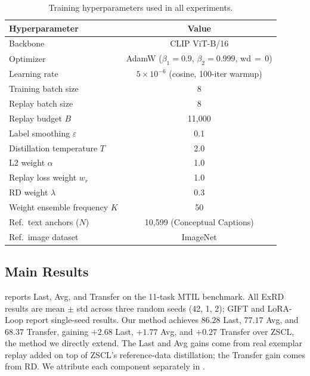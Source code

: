 \documentclass{article}
\begin{document}
  \begin{table}[h]
  \centering
  \caption{Training hyperparameters used in all experiments.}
  \label{tab:hyperparams}
  \begin{tabular}{lc}
  \toprule
  \textbf{Hyperparameter} & \textbf{Value} \\
  \midrule
  Backbone                        & CLIP ViT-B/16 \\
  Optimizer                       & AdamW ($\beta_1{=}0.9$, $\beta_2{=}0.999$, wd$\,{=}\,0$) \\
  Learning rate                   & $5 \times 10^{-6}$ (cosine, 100-iter warmup) \\
  Training batch size             & 8 \\
  Replay batch size               & 8 \\
  Replay budget $B$               & 11{,}000 \\
  Label smoothing $\varepsilon$   & 0.1 \\
  Distillation temperature $T$    & 2.0 \\
  L2 weight $\alpha$              & 1.0 \\
  Replay loss weight $w_r$        & 1.0 \\
  RD weight $\lambda$             & 0.3 \\
  Weight ensemble frequency $K$   & 50 \\
  Ref.\ text anchors ($N$)        & 10{,}599 (Conceptual Captions) \\
  Ref.\ image dataset             & ImageNet \\
  \bottomrule
  \end{tabular}
  \end{table}

  \subsection{Main Results}
  \label{sec:main-results}

   reports Last, Avg, and Transfer on the 11-task MTIL benchmark. All ExRD results are mean $\pm$ std across three random seeds (42, 1, 2); GIFT and LoRA-Loop report single-seed results. Our method achieves $86.28$ Last, $77.17$ Avg, and $68.37$ Transfer,
  gaining $+2.68$ Last, $+1.77$ Avg, and $+0.27$ Transfer over ZSCL, the method
  we directly extend. The Last and Avg gains come from real exemplar replay added
  on top of ZSCL's reference-data distillation; the Transfer gain comes from RD.
  We attribute each component separately in .
\end{document}

